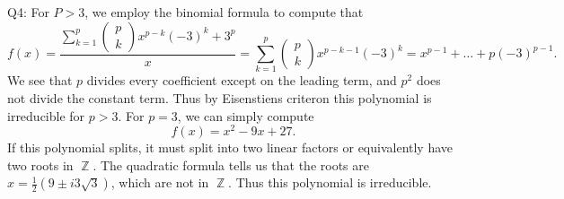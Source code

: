 \documentclass[letterpaper]{article}
\DeclareMathOperator{\Z}{\mathbb{Z}}
\begin{document}
 \noindent Q4: For $P>3$, we employ the binomial formula to compute that
 $$f(x) = \frac{ \sum_{k=1}^p \begin{pmatrix} p \\ k  \end{pmatrix} x^{p-k}(-3)^{k} + 3^p }{x} =  \sum_{k=1}^p \begin{pmatrix} p \\ k  \end{pmatrix} x^{p-k-1}(-3)^k = x^{p-1} + \dots + p(-3)^{p-1}.$$
 We see that $p$ divides every coefficient except on the leading term, and $p^2$ does not divide the constant term. 
 Thus by Eisenstiens criteron this polynomial is irreducible for $p>3$. For $p=3$, we can simply compute $$f(x) = x^2-9x+27.$$
 If this polynomial splits, it must split into two linear factors or equivalently have two roots in $\Z$. The quadratic formula tells us that the roots are $x = \frac{1}{2}(9 \pm i 3\sqrt{3})$, which are not in $\Z$. Thus this polynomial is irreducible. 
 
\end{document}
